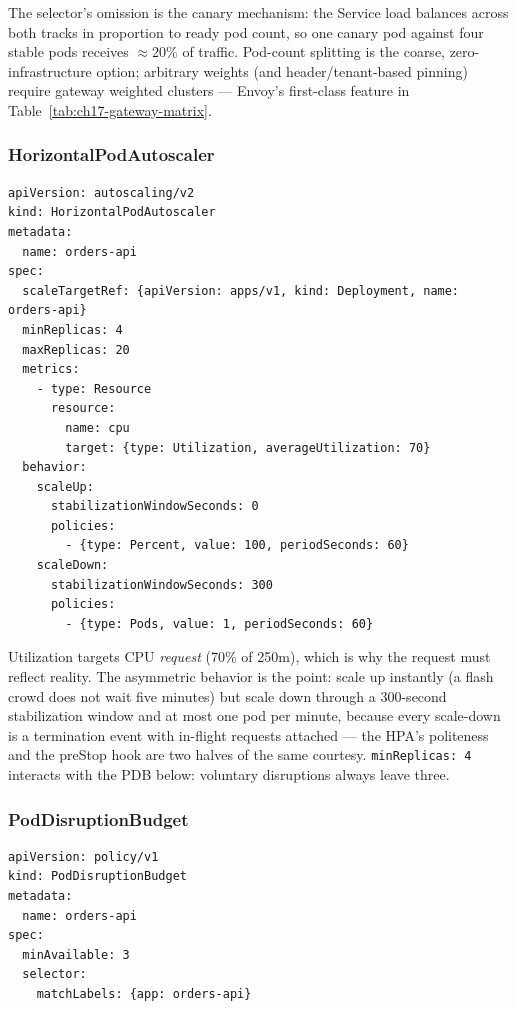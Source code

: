 The selector's omission is the canary mechanism: the Service load
balances across both tracks in proportion to ready pod count, so one
canary pod against four stable pods receives $\approx 20\%$ of traffic.
Pod-count splitting is the coarse, zero-infrastructure option; arbitrary
weights (and header/tenant-based pinning) require gateway weighted
clusters --- Envoy's first-class feature in
Table~\ref{tab:ch17-gateway-matrix}.

\subsubsection*{HorizontalPodAutoscaler}
\label{lst:ch17-hpa}

\begin{verbatim}
apiVersion: autoscaling/v2
kind: HorizontalPodAutoscaler
metadata:
  name: orders-api
spec:
  scaleTargetRef: {apiVersion: apps/v1, kind: Deployment, name: orders-api}
  minReplicas: 4
  maxReplicas: 20
  metrics:
    - type: Resource
      resource:
        name: cpu
        target: {type: Utilization, averageUtilization: 70}
  behavior:
    scaleUp:
      stabilizationWindowSeconds: 0
      policies:
        - {type: Percent, value: 100, periodSeconds: 60}
    scaleDown:
      stabilizationWindowSeconds: 300
      policies:
        - {type: Pods, value: 1, periodSeconds: 60}
\end{verbatim}

Utilization targets CPU \emph{request} (70\% of 250m), which is why the
request must reflect reality. The asymmetric behavior is the point:
scale up instantly (a flash crowd does not wait five minutes) but scale
down through a 300-second stabilization window and at most one pod per
minute, because every scale-down is a termination event with in-flight
requests attached --- the HPA's politeness and the preStop hook are two
halves of the same courtesy. \texttt{minReplicas: 4} interacts with the
PDB below: voluntary disruptions always leave three.

\subsubsection*{PodDisruptionBudget}
\label{lst:ch17-pdb}

\begin{verbatim}
apiVersion: policy/v1
kind: PodDisruptionBudget
metadata:
  name: orders-api
spec:
  minAvailable: 3
  selector:
    matchLabels: {app: orders-api}
\end{verbatim}

